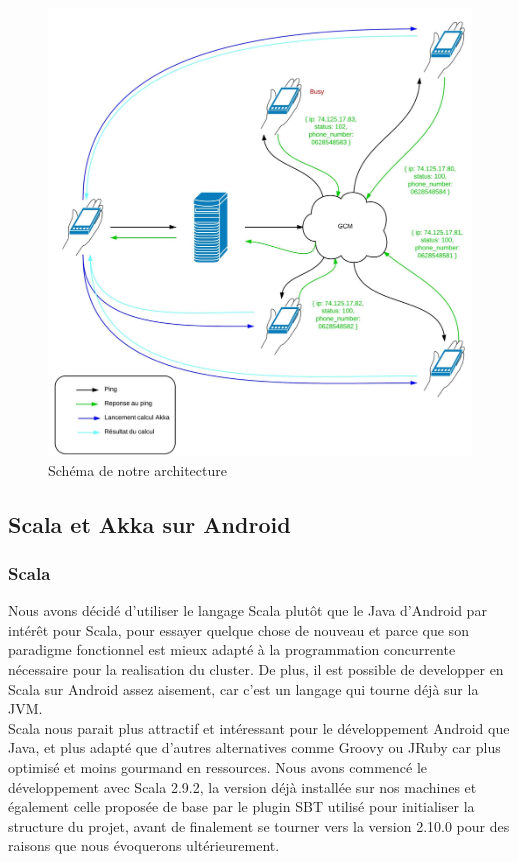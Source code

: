 \documentclass[a4paper,12pt]{article}
\begin{document}
\begin{figure}[h]
\centering
\includegraphics[scale=0.2]{images/gcm.png}
\caption{Schéma de notre architecture}
\end{figure}

\subsection{Scala et Akka sur Android}

\subsubsection{Scala}
Nous avons décidé d'utiliser le langage Scala plutôt que le Java d'Android par
intérêt pour Scala, pour essayer quelque chose de nouveau et parce que son
paradigme fonctionnel est mieux adapté à la programmation concurrente
nécessaire pour la realisation du cluster. De plus, il est possible de
developper en Scala sur Android assez aisement, car c'est un langage qui tourne
déjà sur la JVM.\\ Scala nous parait plus attractif et intéressant pour le
développement Android que Java, et plus adapté que d’autres alternatives comme
Groovy ou JRuby car plus optimisé et moins gourmand en ressources.  Nous avons
commencé le développement avec Scala 2.9.2, la version déjà installée sur nos
machines et également celle proposée de base par le plugin SBT utilisé pour
initialiser la structure du projet, avant de finalement se tourner vers la
version 2.10.0 pour des raisons que nous évoquerons ultérieurement.\\
\end{document}
